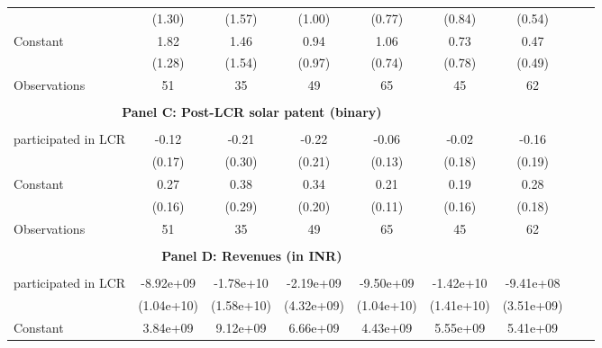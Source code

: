 \begin{table}[htbp]
\begin{tabular}{l*{8}{c}}
                    &      (1.30)         &      (1.57)         &      (1.00)         &      (0.77)         &      (0.84)         &      (0.54)         \\
[1em]
Constant            &        1.82         &        1.46         &        0.94         &        1.06         &        0.73         &        0.47         \\
                    &      (1.28)         &      (1.54)         &      (0.97)         &      (0.74)         &      (0.78)         &      (0.49)         \\
\hline
Observations        &          51         &          35         &          49         &          65         &          45         &          62         \\
\hline \\ \multicolumn{6}{c}{\textbf{Panel C: Post-LCR solar patent (binary)}} \\\\[-1ex]
participated in LCR &       -0.12         &       -0.21         &       -0.22         &       -0.06         &       -0.02         &       -0.16         \\
                    &      (0.17)         &      (0.30)         &      (0.21)         &      (0.13)         &      (0.18)         &      (0.19)         \\
[1em]
Constant            &        0.27\sym{*}  &        0.38         &        0.34\sym{*}  &        0.21\sym{*}  &        0.19         &        0.28         \\
                    &      (0.16)         &      (0.29)         &      (0.20)         &      (0.11)         &      (0.16)         &      (0.18)         \\
\hline
Observations        &          51         &          35         &          49         &          65         &          45         &          62         \\
\hline \\ \multicolumn{6}{c}{\textbf{Panel D: Revenues (in INR)}} \\\\[-1ex]
participated in LCR &   -8.92e+09         &   -1.78e+10         &   -2.19e+09         &   -9.50e+09         &   -1.42e+10         &   -9.41e+08         \\
                    &  (1.04e+10)         &  (1.58e+10)         &  (4.32e+09)         &  (1.04e+10)         &  (1.41e+10)         &  (3.51e+09)         \\
[1em]
Constant            &    3.84e+09         &    9.12e+09         &    6.66e+09         &    4.43e+09         &    5.55e+09         &    5.41e+09\sym{*}  \\

\end{tabular}
\end{table}
